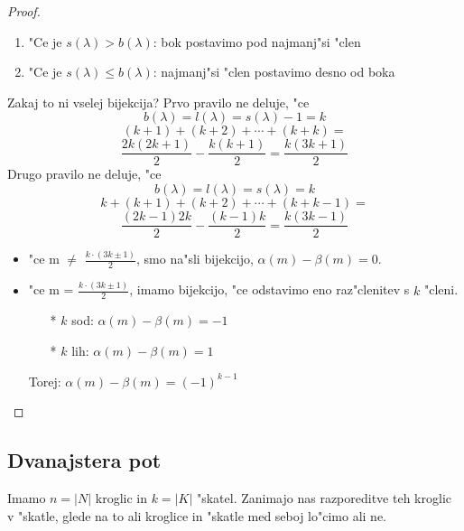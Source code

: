 \documentclass[a4paper,12pt]{article}
\theoremstyle{definition}
\theoremstyle{remark}
\begin{document}
\begin{proof}
	\begin{enumerate}
	    \item "Ce je $s(\lambda) > b(\lambda)$: bok postavimo pod najmanj"si "clen
	    \item "Ce je $s(\lambda) \leqslant b(\lambda)$: najmanj"si "clen postavimo desno od boka
	\end{enumerate}
	
	Zakaj to ni vselej bijekcija? \label{TODO: add image 5} Prvo pravilo ne deluje, "ce
	\[b(\lambda) = l(\lambda) = s(\lambda) - 1 = k\]
	\label{TODO: add image 6}
	\[(k + 1) + (k + 2) + \cdots + (k + k) =\]
	\[\frac{2k (2k + 1)}{2} - \frac{k (k + 1)}{2} = \frac{k (3k + 1)}{2}\]
	Drugo pravilo ne deluje, "ce
	\[b(\lambda) = l(\lambda) = s(\lambda) = k\]
	\label{TODO: add image 7}
	\[k + (k + 1) + (k + 2) + \cdots + (k + k - 1) =\]
	\[\frac{(2k - 1) 2k}{2} - \frac{(k - 1) k}{2} = \frac{k (3k - 1)}{2}\]
	
	\begin{itemize}
	    \item "ce m $\neq$ $\frac{k \cdot (3k \pm 1)}{2}$, smo na"sli bijekcijo, $\alpha(m) - \beta(m) = 0$.
	    \item "ce m = $\frac{k \cdot (3k \pm 1)}{2}$, imamo bijekcijo, "ce odstavimo eno raz"clenitev s $k$ "cleni.
	    \begin{itemize}
	    	\item[*] $k$ sod: $\alpha(m) - \beta(m) = -1$
		    \item[*] $k$ lih: $\alpha(m) - \beta(m) = 1$
		\end{itemize}
	    Torej: $\alpha(m) - \beta(m) = (-1)^{k - 1}$
	\end{itemize}
\end{proof}
\label{TODO: add image 8}

\subsection{Dvanajstera pot}
Imamo $n = |N|$ kroglic in $k = |K|$ "skatel. Zanimajo nas razporeditve teh kroglic v "skatle, glede na to ali kroglice in "skatle med seboj lo"cimo ali ne.
\end{document}

